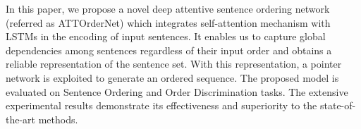 In this paper, we propose a novel deep attentive sentence ordering network (referred as ATTOrderNet) which integrates self-attention mechanism with LSTMs in the encoding of input sentences. It enables us to capture global dependencies among sentences regardless of their input order and obtains a reliable representation of the sentence set. With this representation, a pointer network is exploited to generate an ordered sequence. The proposed model is evaluated on Sentence Ordering and Order Discrimination tasks. The extensive experimental results demonstrate its effectiveness and superiority to the state-of-the-art methods.
